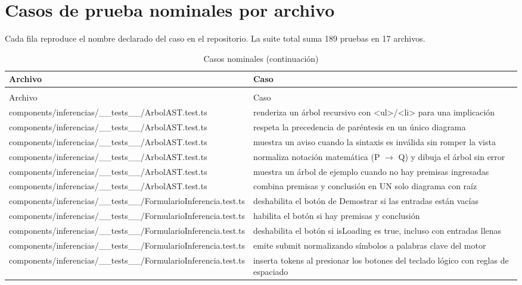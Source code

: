 \documentclass[11pt,a4paper,openany]{book}
\begin{document}
\chapter{Casos de prueba nominales por archivo}
\label{ch:casos}
Cada fila reproduce el nombre declarado del caso en el repositorio. La suite total suma 189 pruebas en 17 archivos.
\begin{center}
\begin{longtable}{ll}
\caption{Casos nominales (selecci\'on de 6 por archivo)} \\
\toprule
Archivo & Caso \\
\midrule
\endfirsthead
\caption{Casos nominales (continuaci\'on)} \\
\toprule
Archivo & Caso \\
\midrule
\endhead
components/inferencias/\_\_tests\_\_/ArbolAST.test.ts & renderiza un árbol recursivo con <ul>/<li> para una implicación \\
components/inferencias/\_\_tests\_\_/ArbolAST.test.ts & respeta la precedencia de paréntesis en un único diagrama \\
components/inferencias/\_\_tests\_\_/ArbolAST.test.ts & muestra un aviso cuando la sintaxis es inválida sin romper la vista \\
components/inferencias/\_\_tests\_\_/ArbolAST.test.ts & normaliza notación matemática (P $ \to $ Q) y dibuja el árbol sin error \\
components/inferencias/\_\_tests\_\_/ArbolAST.test.ts & muestra un árbol de ejemplo cuando no hay premisas ingresadas \\
components/inferencias/\_\_tests\_\_/ArbolAST.test.ts & combina premisas y conclusión en UN solo diagrama con raíz \\
components/inferencias/\_\_tests\_\_/FormularioInferencia.test.ts & deshabilita el botón de Demostrar si las entradas están vacías \\
components/inferencias/\_\_tests\_\_/FormularioInferencia.test.ts & habilita el botón si hay premisas y conclusión \\
components/inferencias/\_\_tests\_\_/FormularioInferencia.test.ts & deshabilita el botón si isLoading es true, incluso con entradas llenas \\
components/inferencias/\_\_tests\_\_/FormularioInferencia.test.ts & emite submit normalizando símbolos a palabras clave del motor \\
components/inferencias/\_\_tests\_\_/FormularioInferencia.test.ts & inserta tokens al presionar los botones del teclado lógico con reglas de espaciado \\

\end{longtable}
\end{center}
\end{document}
